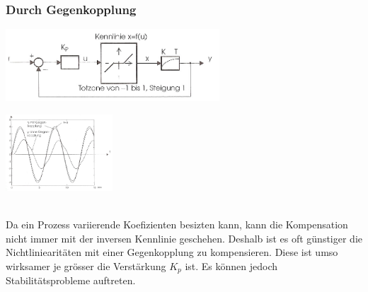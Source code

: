 		\subsubsection{Durch Gegenkopplung }
				\begin{minipage}{11cm}
			\includegraphics[width=8cm]{./bilder/Gegenkopplung.jpg}
        \end{minipage}
		\begin{minipage}{9cm}
        	\includegraphics[width=4cm]{./bilder/Gegenkopplung_dia.jpg}
        \end{minipage}\\
			Da ein Prozess variierende Koefizienten besizten kann, kann die Kompensation
			nicht immer mit der inversen Kennlinie geschehen. Deshalb ist es oft
			günstiger die Nichtliniearitäten mit einer Gegenkopplung zu kompensieren.
			Diese ist umso wirksamer je grösser die Verstärkung $K_p$ ist.
			Es können jedoch Stabilitätsprobleme auftreten.
			

			
